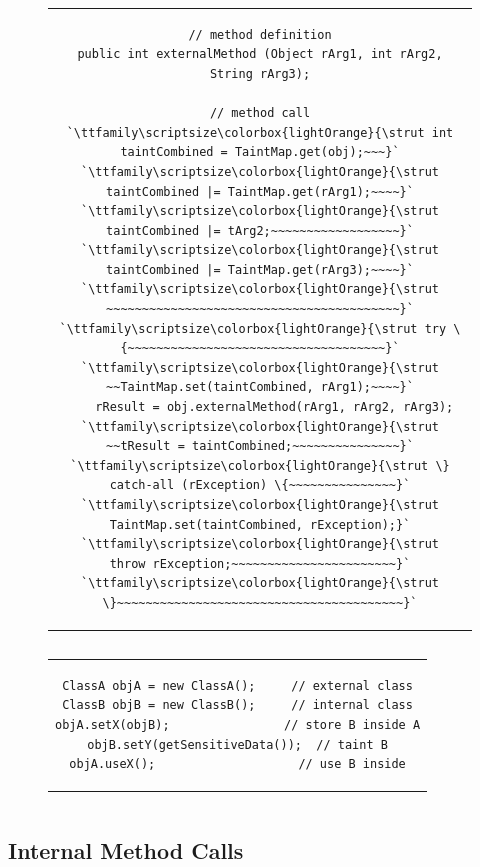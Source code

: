 \documentclass[12pt,twoside,notitlepage]{report}
\newcommand{\highlight}[1]{\colorbox{lightOrange}{\strut #1}}
\newcommand{\lsthl}[1] {\ttfamily\scriptsize\highlight{#1}}
\begin{document}
\begin{figure}
	\centering
	\begin{tabular}{c}
	\begin{lstlisting}
// method definition
public int externalMethod (Object rArg1, int rArg2, String rArg3);

// method call
`\lsthl{int taintCombined = TaintMap.get(obj);~~~}`
`\lsthl{taintCombined |= TaintMap.get(rArg1);~~~~}`
`\lsthl{taintCombined |= tArg2;~~~~~~~~~~~~~~~~~~}`
`\lsthl{taintCombined |= TaintMap.get(rArg3);~~~~}`
`\lsthl{~~~~~~~~~~~~~~~~~~~~~~~~~~~~~~~~~~~~~~~~~}`
`\lsthl{try \{~~~~~~~~~~~~~~~~~~~~~~~~~~~~~~~~~~~~}`
`\lsthl{~~TaintMap.set(taintCombined, rArg1);~~~~}`
	rResult = obj.externalMethod(rArg1, rArg2, rArg3);
`\lsthl{~~tResult = taintCombined;~~~~~~~~~~~~~~~}`
`\lsthl{\} catch-all (rException) \{~~~~~~~~~~~~~~~}`
`\lsthl{	TaintMap.set(taintCombined, rException);}`
`\lsthl{	throw rException;~~~~~~~~~~~~~~~~~~~~~~~}`
`\lsthl{\}~~~~~~~~~~~~~~~~~~~~~~~~~~~~~~~~~~~~~~~~}`
	\end{lstlisting}
	\end{tabular}
	\begin{lstlisting}[caption={Instrumentation of external method calls. The second and third arguments do not inherit combined taint because they are immutable.},
	                   label={listing:TaintPropagation_ExternalMethodCall}]
	\end{lstlisting}
\end{figure}

\begin{figure}
	\centering
	\begin{tabular}{c}
	\begin{lstlisting}
ClassA objA = new ClassA();     // external class
ClassB objB = new ClassB();     // internal class
objA.setX(objB);                // store B inside A
objB.setY(getSensitiveData());  // taint B
objA.useX();                    // use B inside
	\end{lstlisting}
	\end{tabular}
	\begin{lstlisting}[caption={Example of a propagation logic hole},
	                   label={listing:ExternalMethodCalls_LogicHole}]
	\end{lstlisting}
\end{figure}

\subsection{Internal Method Calls}
\label{section:TaintPropagation_MethodCalls_Internal}
\end{document}
